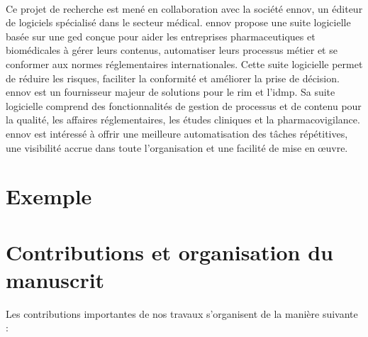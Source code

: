 \paragraph{}
Ce projet de recherche est mené en collaboration avec la société \gls{ennov}, un éditeur de logiciels spécialisé dans le secteur médical.
\gls{ennov} propose une suite logicielle basée sur une \gls{ged} conçue pour aider les entreprises pharmaceutiques et biomédicales à gérer leurs contenus, automatiser leurs processus métier et se conformer aux normes réglementaires internationales.
Cette suite logicielle permet de réduire les risques, faciliter la conformité et améliorer la prise de décision.
\gls{ennov} est un fournisseur majeur de solutions pour le \gls{rim} et l'\gls{idmp}.
Sa suite logicielle comprend des fonctionnalités de gestion de processus et de contenu pour la qualité, les affaires réglementaires, les études cliniques et la pharmacovigilance.
\gls{ennov} est intéressé à offrir une meilleure automatisation des tâches répétitives, une visibilité accrue dans toute l'organisation et une facilité de mise en œuvre. 

\section{Exemple}

\FloatBarrier

\section{Contributions et organisation du manuscrit}

\noindent
Les contributions importantes de nos travaux s'organisent de la manière suivante :

